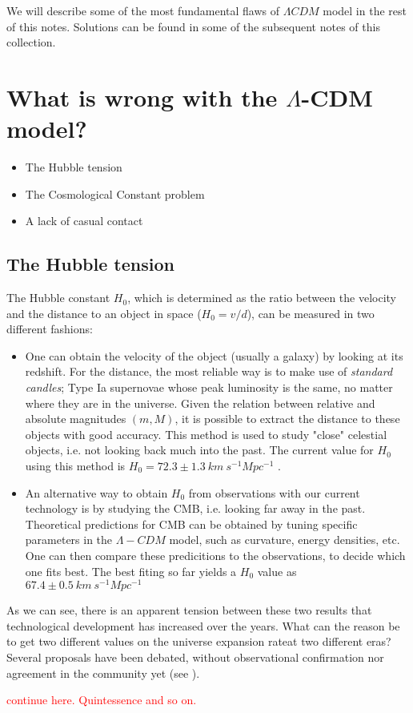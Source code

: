 \documentclass[11pt, a4paper]{article} %
\begin{document}
We will describe some of the most fundamental flaws of $\Lambda CDM$ model in the rest of this notes. Solutions can be found in some of the subsequent notes of this collection.

\section*{What is wrong with the $\Lambda$-CDM model?}

\begin{itemize}
	\item The Hubble tension
	\item The Cosmological Constant problem
	\item A lack of casual contact
\end{itemize}

\subsection*{The Hubble tension}

The Hubble constant $H_{0}$, which is determined as the ratio between the velocity and the distance to an object in space ($H_{0} = v/d$), can be measured in two different fashions:

\begin{itemize}
	\item One can obtain the velocity of the object (usually a galaxy) by looking at its redshift. For the distance, the most reliable way is to make use of \textit{standard candles}; Type Ia supernovae whose peak luminosity is the same, no matter where they are in the universe. Given the relation between relative and absolute magnitudes $(m, M)$, it is possible to extract the distance to these objects with good accuracy. This method is used to study "close" celestial objects, i.e. not looking back much into the past. The current value for $H_{0}$ using this method is $H_{0} = 72.3 \pm 1.3 \: km \:s^{-1} Mpc^{-1}$ \cite{2020planck}.
	
	\item An alternative way to obtain $H_{0}$ from observations with our current technology is by studying the CMB, i.e. looking far away in the past. Theoretical predictions for CMB can be obtained by tuning specific parameters in the $\Lambda- CDM$ model, such as curvature, energy densities, etc. One can then compare these predicitions to the observations, to decide which one fits best. The best fiting so far yields a $H_{0}$ value as $67.4 \pm 0.5 \: km \:s^{-1} Mpc^{-1}$ \cite{Riess_2021}
\end{itemize}

As we can see, there is an apparent tension between these two results that technological development has increased over the years. What can the reason be to get two different values on the universe expansion rateat two different eras? Several proposals have been debated, without observational confirmation nor agreement in the community yet (see \cite{di2021realm}).

\textcolor{red}{continue here. Quintessence and so on.}







\end{document}
